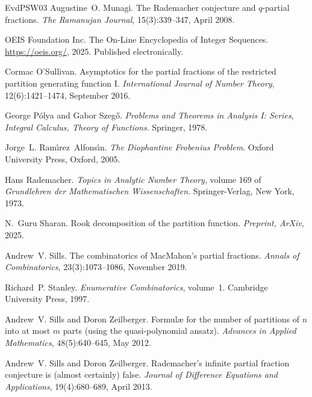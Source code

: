 \documentclass[11pt]{article}
\theoremstyle{plain}
\theoremstyle{definition}
\begin{document}
\begin{thebibliography}{EvdPSW03}
  Augustine~O. Munagi. {\newblock}The
  Rademacher conjecture and $q$-partial fractions. {\newblock}\textit{The
  Ramanujan Journal}, 15(3):339--347, April 2008.
  
  OEIS Foundation Inc. {\newblock}The On-Line
  Encyclopedia of Integer Sequences. {\newblock}\url{https://oeis.org/}, 2025.
  {\newblock}Published electronically.
  
  Cormac O'Sullivan.
  {\newblock}Asymptotics for the partial fractions of the restricted partition
  generating function I. {\newblock}\textit{International Journal of Number
  Theory}, 12(6):1421--1474, September 2016.
  
  George P{\'o}lya and Gabor Szeg{\H o}.
  {\newblock}\textit{Problems and Theorems in Analysis I: Series, Integral
  Calculus, Theory of Functions}. {\newblock}Springer, 1978.
  
  Jorge~L.
  Ram{\'\i}rez~Alfons{\'\i}n. {\newblock}\textit{The Diophantine Frobenius
  Problem}. {\newblock}Oxford University Press, Oxford, 2005.
  
  Hans Rademacher. {\newblock}\textit{Topics in
  Analytic Number Theory}, volume 169 of \textit{Grundlehren der
  Mathematischen Wissenschaften}. {\newblock}Springer-Verlag, New York, 1973.
  
  N.~Guru Sharan. {\newblock}Rook decomposition of
  the partition function. {\newblock}\textit{Preprint, ArXiv}, 2025.
  
  Andrew~V. Sills. {\newblock}The combinatorics
  of MacMahon's partial fractions. {\newblock}\textit{Annals of
  Combinatorics}, 23(3):1073--1086, November 2019.
  
  Richard~P. Stanley.
  {\newblock}\textit{Enumerative Combinatorics}, volume~1.
  {\newblock}Cambridge University Press, 1997.
  
  Andrew~V. Sills and Doron Zeilberger.
  {\newblock}Formul{\ae} for the number of partitions of $n$ into at most $m$
  parts (using the quasi-polynomial ansatz). {\newblock}\textit{Advances in
  Applied Mathematics}, 48(5):640--645, May 2012.
  
  Andrew~V. Sills and Doron Zeilberger.
  {\newblock}Rademacher's infinite partial fraction conjecture is (almost
  certainly) false. {\newblock}\textit{Journal of Difference Equations and
  Applications}, 19(4):680--689, April 2013.
\end{thebibliography}
\end{document}
